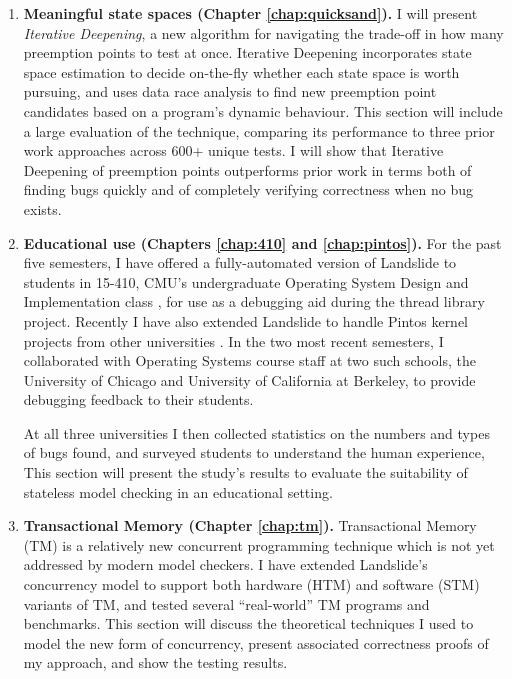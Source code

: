 \begin{enumerate}
	\item {\bf Meaningful state spaces (Chapter \ref{chap:quicksand}).}
		I will present {\em Iterative Deepening}, a new algorithm for navigating the trade-off in how many preemption points to test at once.
		Iterative Deepening incorporates state space estimation \cite{estimation} to decide on-the-fly whether each state space is worth pursuing, and uses data race analysis \cite{tsan} to find new preemption point candidates based on a program's dynamic behaviour.
		This section will include a large evaluation of the technique, comparing its performance to three prior work approaches across 600+ unique tests.
		I will show that Iterative Deepening of preemption points outperforms prior work in terms both of finding bugs quickly and of completely verifying correctness when no bug exists.
	\item {\bf Educational use (Chapters \ref{chap:410} and \ref{chap:pintos}).}
		For the past five semesters, I have offered a fully-automated version of Landslide to students in 15-410, CMU's undergraduate Operating System Design and Implementation class \cite{kspec,thrlib}, for use as a debugging aid during the thread library project.
		Recently I have also extended Landslide to handle Pintos kernel projects from other universities \cite{pintos}.
		In the two most recent semesters, I collaborated with Operating Systems course staff at two such schools, the University of Chicago and University of California at Berkeley,
		to provide debugging feedback to their students.

		At all three universities I then collected statistics on the numbers and types of bugs found,
		and surveyed students to understand the human experience,
		This section will present the study's results
		to evaluate the suitability of stateless model checking in an educational setting.
	\item {\bf Transactional Memory (Chapter \ref{chap:tm}).}
		Transactional Memory (TM) is a relatively new concurrent programming technique \cite{transactional-memory}
		which is not yet addressed by modern model checkers.
		I have extended Landslide's concurrency model to support both hardware (HTM) and software (STM) variants of TM,
		and tested several ``real-world'' TM programs and benchmarks.
		This section will discuss the theoretical techniques I used to model the new form of concurrency,
		present associated correctness proofs of my approach,
		and show the testing results.
\end{enumerate}

